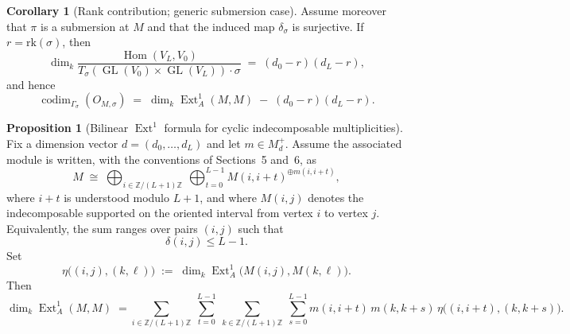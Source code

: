 \documentclass{article}
\newcommand{\Hom}{\operatorname{Hom}}
\newcommand{\codim}{\operatorname{codim}}
\newcommand{\Ext}{\operatorname{Ext}}
\newcommand{\GL}{\operatorname{GL}}
\theoremstyle{definition}
\newtheorem{proposition}[theorem]{Proposition}
\newtheorem{corollary}[theorem]{Corollary}
\begin{document}
\begin{corollary}[Rank contribution; generic submersion case]
\label{cor:rank_correction}
Assume moreover that $\pi$ is a submersion at $M$ and that the induced map
$\delta_\sigma$ is surjective. If $r=\text{rk}(\sigma)$, then
\[
\dim_k \frac{\Hom(V_L,V_0)}{T_\sigma(\GL(V_0)\times \GL(V_L))\cdot \sigma}
\;=\;
(d_0-r)(d_L-r),
\]
and hence
\[
\codim_{\Gamma_\sigma}(O_{M,\sigma})
\;=\;
\dim_k \Ext^1_A(M,M) \;-\; (d_0-r)(d_L-r).
\]
\end{corollary}

\begin{proposition}[Bilinear $\Ext^1$ formula for cyclic indecomposable multiplicities]\label{prop:cyclic_bilinear_ext} Fix a dimension vector $d=(d_0,\dots,d_L)$ and let $m\in M_d^+$. Assume the associated module is written, with the conventions of Sections~5 and~6, as
\[
M \;\cong\;
\bigoplus_{i\in \mathbb{Z}/(L+1)\mathbb{Z}}
\ \bigoplus_{t=0}^{L-1}
M(i,i+t)^{\oplus m(i,i+t)},
\]
where $i+t$ is understood modulo $L+1$, and where $M(i,j)$ denotes the indecomposable supported on the oriented interval from vertex $i$ to vertex $j$. Equivalently, the sum ranges over pairs $(i,j)$ such that
\[
\delta(i,j)\le L-1.
\]
\noindent
Set
\[
\eta\big((i,j),(k,\ell)\big)
\;:=\;
\dim_k\Ext_A^1\!\big(M(i,j),M(k,\ell)\big).
\]
Then
\[
\dim_k\Ext_A^1(M,M)
\;=
\sum_{i\in \mathbb{Z}/(L+1)\mathbb{Z}}\ \sum_{t=0}^{L-1}
\ \sum_{k\in \mathbb{Z}/(L+1)\mathbb{Z}}\ \sum_{s=0}^{L-1}
m(i,i+t)\,m(k,k+s)\,
\eta\big((i,i+t),(k,k+s)\big).
\]
\end{proposition}
\end{document}
